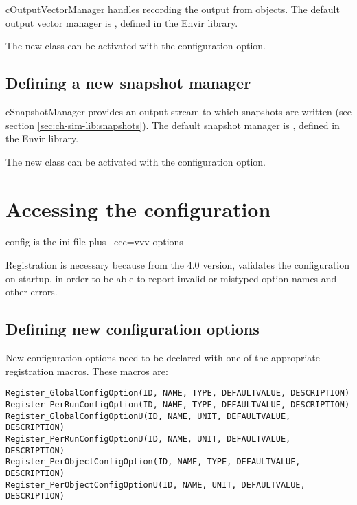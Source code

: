 cOutputVectorManager handles recording the output from  objects.
The default output vector manager is ,
defined in the Envir library.

The new class can be activated with the 
configuration option.


\subsection{Defining a new snapshot manager}
\label{sec:plugin-exts:snapshotmanager}

cSnapshotManager provides an output stream to which snapshots are written
(see section \ref{sec:ch-sim-lib:snapshots}). The default snapshot manager
is , defined in the Envir library.

The new class can be activated with the 
configuration option.


\section{Accessing the configuration}
\label{sec:plugin-exts:accessing-config}

config is the ini file plus --ccc=vvv options

\begin{note}
Registration is necessary because from the 4.0 version, {\opp} validates
the configuration on startup, in order to be able to report invalid or
mistyped option names and other errors.
\end{note}

\subsection{Defining new configuration options}

New configuration options need to be declared with one of the appropriate
registration macros. These macros are:

\begin{verbatim}
Register_GlobalConfigOption(ID, NAME, TYPE, DEFAULTVALUE, DESCRIPTION)
Register_PerRunConfigOption(ID, NAME, TYPE, DEFAULTVALUE, DESCRIPTION)
Register_GlobalConfigOptionU(ID, NAME, UNIT, DEFAULTVALUE, DESCRIPTION)
Register_PerRunConfigOptionU(ID, NAME, UNIT, DEFAULTVALUE, DESCRIPTION)
Register_PerObjectConfigOption(ID, NAME, TYPE, DEFAULTVALUE, DESCRIPTION)
Register_PerObjectConfigOptionU(ID, NAME, UNIT, DEFAULTVALUE, DESCRIPTION)
\end{verbatim}

